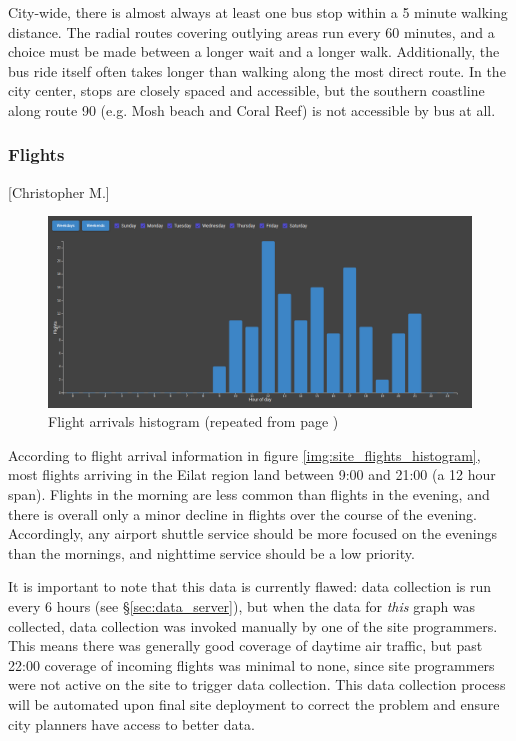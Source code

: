 \documentclass[12pt]{article}                               %
\newcommand{\repeatcaption}[2]{                             %
  \renewcommand{\thefigure}{\ref{#1}}
  \captionsetup{list=no}
  \caption{#2 (repeated from page \pageref{#1})}
}
\begin{document}
City-wide, there is almost always at least one bus stop within a 5 minute walking distance. The radial routes covering outlying areas run every 60 minutes, and a choice must be made between a longer wait and a longer walk. Additionally, the bus ride itself often takes longer than walking along the most direct route. In the city center, stops are closely spaced and accessible, but the southern coastline along route 90 (e.g. Mosh beach and Coral Reef) is not accessible by bus at all.

\subsubsection{Flights}[Christopher M.]
\begin{figure}[H]
    \centering
    \includegraphics[width=1\textwidth]{images/site_flights_graph.png}
    \repeatcaption{img:site_flights_histogram}{Flight arrivals histogram}
\end{figure}

According to flight arrival information in figure \ref{img:site_flights_histogram}, most flights arriving in the Eilat region land between 9:00 and 21:00 (a 12 hour span). Flights in the morning are less common than flights in the evening, and there is overall only a minor decline in flights over the course of the evening. Accordingly, any airport shuttle service should be more focused on the evenings than the mornings, and nighttime service should be a low priority.

It is important to note that this data is currently flawed: data collection is run every 6 hours (see \S\ref{sec:data_server}), but when the data for \textit{this} graph was collected, data collection was invoked manually by one of the site programmers. This means there was generally good coverage of daytime air traffic, but past 22:00 coverage of incoming flights was minimal to none, since site programmers were not active on the site to trigger data collection. This data collection process will be automated upon final site deployment to correct the problem and ensure city planners have access to better data.
\end{document}
